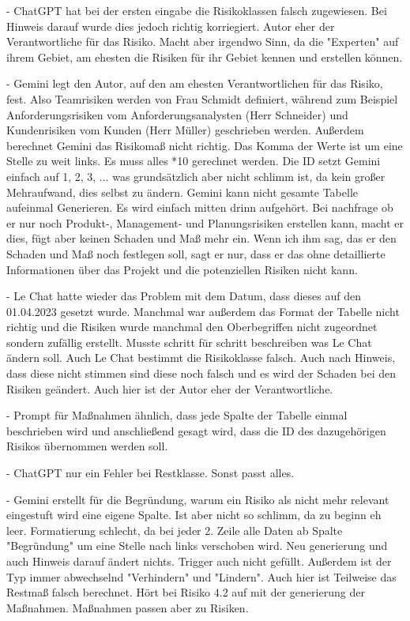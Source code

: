         - ChatGPT hat bei der ersten eingabe die Risikoklassen falsch zugewiesen. Bei Hinweis darauf wurde dies jedoch richtig korriegiert.
        Autor eher der Verantwortliche für das Risiko. Macht aber irgendwo Sinn, da die "Experten" auf ihrem Gebiet, am ehesten die Risiken
        für ihr Gebiet kennen und erstellen können.
        
        - Gemini legt den Autor, auf den am ehesten Verantwortlichen für das Risiko, fest. Also Teamrisiken werden von Frau Schmidt definiert,
        während zum Beispiel Anforderungsrisiken vom Anforderungsanalysten (Herr Schneider) und Kundenrisiken vom Kunden (Herr Müller) geschrieben
        werden. Außerdem berechnet Gemini das Risikomaß nicht richtig. Das Komma der Werte ist um eine Stelle zu weit links. Es muss alles *10 
        gerechnet werden. Die ID setzt Gemini einfach auf 1, 2, 3, ... was grundsätzlich aber nicht schlimm ist, da kein großer Mehraufwand, dies 
        selbst zu ändern. Gemini kann nicht gesamte Tabelle aufeinmal Generieren. Es wird einfach mitten drinn aufgehört. Bei nachfrage ob er nur 
        noch Produkt-, Management- und Planungsrisiken erstellen kann, macht er dies, fügt aber keinen Schaden und Maß mehr ein. Wenn ich ihm sag, 
        das er den Schaden und Maß noch festlegen soll, sagt er nur, dass er das ohne detaillierte Informationen über das Projekt und die potenziellen
        Risiken nicht kann.
        
        - Le Chat hatte wieder das Problem mit dem Datum, dass dieses auf den 01.04.2023 gesetzt wurde. Manchmal war außerdem das Format der Tabelle 
        nicht richtig und die Risiken wurde manchmal den Oberbegriffen nicht zugeordnet sondern zufällig erstellt. Musste schritt für schritt beschreiben 
        was Le Chat ändern soll. Auch Le Chat bestimmt die Risikoklasse falsch. Auch nach Hinweis, dass diese nicht stimmen sind diese noch falsch 
        und es wird der Schaden bei den Risiken geändert. Auch hier ist der Autor eher der Verantwortliche.
        
        
        - Prompt für Maßnahmen ähnlich, dass jede Spalte der Tabelle einmal beschrieben wird und anschließend gesagt wird, dass die ID des dazugehörigen
        Risikos übernommen werden soll.
        
        - ChatGPT nur ein Fehler bei Restklasse. Sonst passt alles.
        
        - Gemini erstellt für die Begründung, warum ein Risiko als nicht mehr relevant eingestuft wird eine eigene Spalte. Ist aber nicht so schlimm, da 
        zu beginn eh leer. Formatierung schlecht, da bei jeder 2. Zeile alle Daten ab Spalte "Begründung" um eine Stelle nach links verschoben wird. Neu 
        generierung und auch Hinweis darauf ändert nichts. Trigger auch nicht gefüllt. Außerdem ist der Typ immer abwechselnd "Verhindern" und "Lindern".
        Auch hier ist Teilweise das Restmaß falsch berechnet. Hört bei Risiko 4.2 auf mit der generierung der Maßnahmen. Maßnahmen passen aber zu Risiken.
        
